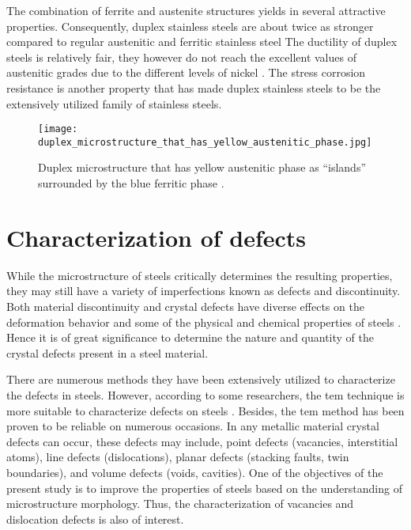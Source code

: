The combination of ferrite and austenite structures yields in several attractive properties. Consequently, duplex stainless steels are about twice as stronger compared to regular austenitic and ferritic stainless steel \cite{steels3practical} The ductility of duplex steels is relatively fair, they however do not reach the excellent values of austenitic grades due to the different levels of nickel \cite{molabe2018determining}. The stress corrosion resistance is another property that has made duplex stainless steels to be the extensively utilized family of stainless steels. 

\begin{figure}[H]
    \centering
    \texttt{[image: duplex\_microstructure\_that\_has\_yellow\_austenitic\_phase.jpg]}
    \caption{Duplex microstructure that has yellow austenitic phase as “islands” surrounded by the blue ferritic phase \cite{steels3practical}.}
    \label{ch3:figure:duplex_microstructure}
\end{figure}

\section{Characterization of defects} 
While the microstructure of steels critically determines the resulting properties, they may still have a variety of imperfections known as defects and discontinuity. Both material discontinuity and crystal defects have diverse effects on the deformation behavior and some of the physical and chemical properties of steels \cite{suryanarayana2017microstructure}. Hence it is of great significance to determine the nature and quantity of the crystal defects present in a steel material. 

There are numerous methods they have been extensively utilized to characterize the defects in steels. However, according to some researchers, the \Acrfull{tem} technique is more suitable to characterize defects on steels \cite{george2002introduction, bhadeshia2017steels}. Besides, the \acrshort{tem} method has been proven to be reliable on numerous occasions. In any metallic material crystal defects can occur, these defects may include, point defects (vacancies, interstitial atoms), line defects (dislocations), planar defects (stacking faults, twin boundaries), and volume defects (voids, cavities). One of the objectives of the present study is to improve the properties of steels based on the understanding of microstructure morphology. Thus, the characterization of vacancies and dislocation defects is also of interest.

